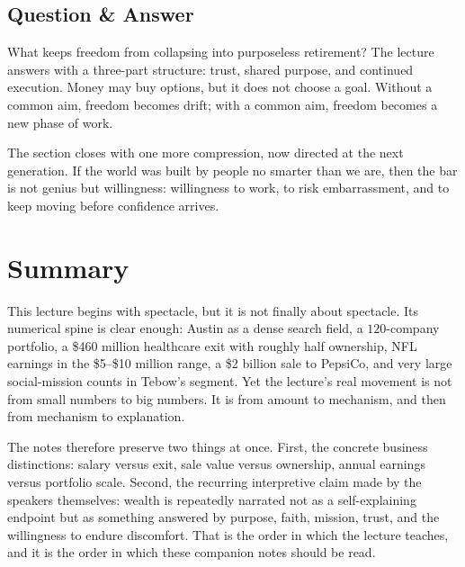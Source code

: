 \subsection{Question \& Answer}

What keeps freedom from collapsing into purposeless retirement? The lecture answers with a three-part structure: trust, shared purpose, and continued execution. Money may buy options, but it does not choose a goal. Without a common aim, freedom becomes drift; with a common aim, freedom becomes a new phase of work.

The section closes with one more compression, now directed at the next generation. If the world was built by people no smarter than we are, then the bar is not genius but willingness: willingness to work, to risk embarrassment, and to keep moving before confidence arrives.

\section{Summary}

This lecture begins with spectacle, but it is not finally about spectacle. Its numerical spine is clear enough: Austin as a dense search field, a \(120\)-company portfolio, a \$460 million healthcare exit with roughly half ownership, NFL earnings in the \$5--\$10 million range, a \$2 billion sale to PepsiCo, and very large social-mission counts in Tebow's segment. Yet the lecture's real movement is not from small numbers to big numbers. It is from amount to mechanism, and then from mechanism to explanation.

The notes therefore preserve two things at once. First, the concrete business distinctions: salary versus exit, sale value versus ownership, annual earnings versus portfolio scale. Second, the recurring interpretive claim made by the speakers themselves: wealth is repeatedly narrated not as a self-explaining endpoint but as something answered by purpose, faith, mission, trust, and the willingness to endure discomfort. That is the order in which the lecture teaches, and it is the order in which these companion notes should be read.